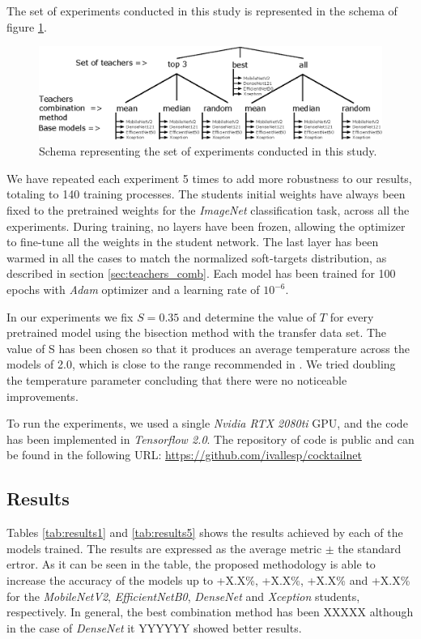 \documentclass{elsarticle}
\begin{document}
	The set of experiments conducted in this study is represented in the schema of figure \ref{fig:schema}.
	
\begin{figure}[h!]
	\centering
	\includegraphics[width=0.9\linewidth]{img/schema}
	\caption{Schema representing the set of experiments conducted in this study.}
	\label{fig:schema}
\end{figure}

		
	We have repeated each experiment 5 times to add more robustness to our results, totaling to 140 training processes. The students initial weights have always been fixed to the pretrained weights for the \textit{ImageNet} classification task, across all the experiments. During training, no layers have been frozen, allowing the optimizer to fine-tune all the weights in the student network. The last layer has been warmed in all the cases to match the normalized soft-targets distribution, as described in section \ref{sec:teachers_comb}.  Each model has been trained for 100 epochs with \textit{Adam} optimizer \cite{Kingma14} and a learning rate of $10^{-6}$.
	
	 In our experiments we fix $S=0.35$ and determine the value of $T$ for every pretrained model using the bisection method with the transfer data set. The value of S has been chosen so that it produces an average temperature across the models of 2.0, which is close to the range recommended in \cite{hinton2015}. We tried doubling the temperature parameter concluding that there were no noticeable improvements.
	 
	 To run the experiments, we used a single \textit{Nvidia RTX 2080ti} GPU, and the code has been implemented in \textit{Tensorflow 2.0}. The repository of code is public and can be found in the following URL: \url{https://github.com/ivallesp/cocktailnet}
		
	\subsection{Results}  \label{sec:results}
	Tables \ref{tab:results1} and \ref{tab:results5} shows the results achieved by each of the models trained. The results are expressed as the average metric $\pm$ the standard ertror. As it can be seen in the table, the proposed methodology is able to increase the accuracy of the models up to +X.X\%, +X.X\%, +X.X\% and +X.X\% for the \textit{MobileNetV2}, \textit{EfficientNetB0}, \textit{DenseNet} and \textit{Xception} students, respectively. In general, the best combination method has been XXXXX although in the case of \textit{DenseNet} it YYYYYY showed better results. 
	
\end{document}
